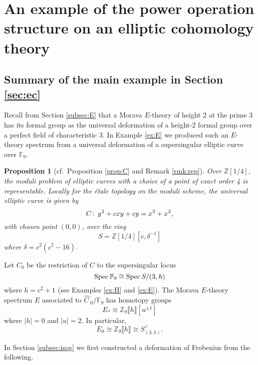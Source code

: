 \documentclass{gtpart}
\newtheorem{prop}[thm]{Proposition}
\theoremstyle{definition}
\theoremstyle{remark}
\def\co{\colon\thinspace}
\newcommand{\mb}[1]{\mathbb{#1}}
\newcommand{\Spec}{{\rm Spec\thinspace}}
\newcommand{\BF}{{\mb F}}
\newcommand{\BZ}{{\mb Z}}
\newcommand{\HC}{\widehat{C~}\!}
\numberwithin{equation}{section}
\numberwithin{thm}{section}
\begin{document}
\section{An example of the power operation structure on an elliptic cohomology theory}
\label{sec:p3}

\subsection{Summary of the main example in Section \ref{sec:ec}}
\label{subsec:summary}

Recall from Section \ref{subsec:E} that a Morava $E$-theory of height 2 
at the prime 3 has its formal group as the universal deformation of a 
height-2 formal group over a perfect field of characteristic 3.  In 
Example \ref{ex:E} we produced such an $E$-theory spectrum from a 
universal deformation of a supersingular elliptic curve over $\BF_9$.  

\begin{prop}[cf.~Proposition \ref{prop:C} and Remark \ref{rmk:rep}]
 Over $\BZ[1/4]$, the moduli problem of elliptic curves with a choice of 
 a point of exact order 4 is representable.  Locally for the \'etale 
 topology on the moduli scheme, the universal elliptic curve is given by 
 \begin{equation}
 \label{C}
  C \co y^2 + c x y + c y = x^3 + x^2, 
 \end{equation}
 with chosen point $(0,0)$, over the ring 
 \[
  S = \BZ[1/4][c,\delta^{-1}] 
 \]
 where $\delta = c^2 (c^2 - 16)$.  
\end{prop}

Let $C_0$ be the restriction of $C$ to the supersingular locus 
\[
 \Spec \BF_9 \cong \Spec S/(3,h) 
\]
where $h = c^2 + 1$ (see Examples \ref{ex:H} and \ref{ex:E}).  The 
Morava $E$-theory spectrum $E$ associated to $\HC_0/\BF_9$ has homotopy 
groups 
\[
 E_* \cong \BZ_9 \llbracket h \rrbracket [u^{\pm1}] 
\]
where $|h| = 0$ and $|u| = 2$.  In particular, 
\begin{equation}
\label{E0}
 E_0 \cong \BZ_9 \llbracket h \rrbracket \cong S_{(3,h)}^\wedge.  
\end{equation}

In Section \ref{subsec:isog} we first constructed a deformation of 
Frobenius from the following.  
\end{document}
